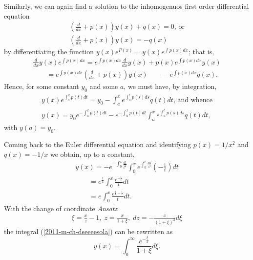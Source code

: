 Similarly, we can again find a solution to the inhomogenuos  first order differential equation
\begin{equation}
\begin{array}{l}
\left(\frac{d}{dx} + p(x)  \right)  y(x)+ q(x)=0\textrm{, or}      \\
\left(\frac{d }{dx}  + p(x) \right)   y(x)= - q(x)
\end{array}
\label{2011-m-ch-dseeinh}
\end{equation}
by differentiating the function $y(x)e^{P(x)}=y(x)e^{ \int p(x) dx}$;
that is,
\begin{equation}
\begin{array}{l}
\frac{d }{dx}   y(x)e^{  \int p(x) dx} =
e^{  \int p(x) dx}\frac{d }{dx}   y(x) + p(x) e^{ \int p(x) dx}  y(x) \\
\qquad
=  e^{  \int p(x) dx}\left(\frac{d }{dx}    + p(x) \right)   y(x)
\qquad    - e^{  \int p(x) dx} q(x).
\end{array}
\label{2011-m-ch-dsee1213}
\end{equation}
Hence, for some constant $y_0$ and some $a$,
we must have, by integration,
\begin{equation}
\begin{array}{l}
y(x)e^{  \int_a^x p(t) dt} = y_0 -  \int_a^x e^{ \int_a^t p(s) ds }q(t) dt\textrm{, and whence}\\
y(x)= y_0e^{ - \int_a^x p(t) dt}  -  e^{ - \int_a^x p(t) dt} \int_a^x e^{ \int_a^t p(s) ds} q(t) dt,
\end{array}
\label{2011-m-ch-dseekh}
\end{equation}
with $y(a)= y_0$.

Coming back to the Euler differential equation and identifying
$p(x)=1/x^2$ and $q(x) = - 1/x$ we obtain, up to a constant,
\begin{equation}
\begin{array}{l}
y(x)=    -  e^{ - \int_0^x \frac{ dt}{t^2}} \int_0^x e^{ \int_0^t \frac{ ds}{s^2}} \left(-\frac{ 1}{t}\right) dt
\\ \qquad =
     e^{   \frac{1}{x}} \int_0^x  \frac{ e^{ - \frac{1}{t}}}{t} dt
\\ \qquad =
e^{   } \int_0^x  \frac{ e^{ \frac{1}{x} -\frac{1}{t}}}{t} dt.
\end{array}
\label{2011-m-ch-dseeeesola}
\end{equation}
With the change of coordinate {\it Ansatz}
\begin{equation}
\begin{array}{l}
\xi = \frac{x}{z}-1
, \;
z =  \frac{x}{1+ \xi}
, \;
dz =  -\frac{x}{(1+ \xi)^2} d\xi
\end{array}
\label{2011-m-ch-dseeans}
\end{equation}
the integral (\ref{2011-m-ch-dseeeesola}) can be rewritten as
\begin{equation}
y(x)= \int_0^\infty
\frac{e^{-\frac{\xi}{x}}}{1+\xi} d\xi .
\label{2011-m-ch-dseefasol}
\end{equation}


